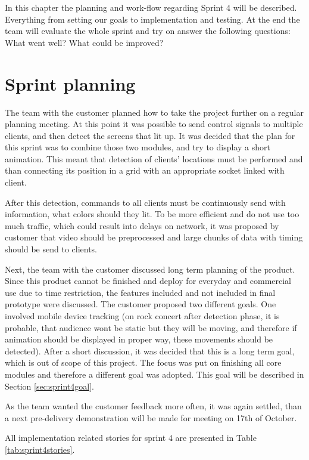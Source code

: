 In this chapter the planning and work-flow regarding Sprint 4 will be described. 
Everything from setting our goals to implementation and testing. At the end the team will evaluate the whole sprint and try on answer the following questions: What went well? What could be improved? 
\section{Sprint planning}

The team with the customer planned how to take the project further on a regular planning meeting.
At this point it was possible to send control signals to multiple clients, and then detect the screens that lit up. 
It was decided that the plan for this sprint was to combine those two modules, and try to display a short animation.
This meant that detection of clients' locations must be performed and than connecting its position in a grid with an appropriate socket linked with client.

After this detection, commands to all clients must be continuously send with information, what colors should they lit.
To be more efficient and do not use too much traffic, which could result into delays on network, it was proposed by customer that video should be preprocessed and large chunks of data with timing should be send to clients.

Next, the team with the customer discussed long term planning of the product.
Since this product cannot be finished and deploy for everyday and commercial use due to time restriction, the features included and not included in final prototype were discussed.
The customer proposed two different goals.
One involved mobile device tracking (on rock concert after detection phase, it is probable, that audience wont be static but they will be moving, and therefore if animation should be displayed in proper way, these movements should be detected).
After a short discussion, it was decided that this is a long term goal, which is out of scope of this project.
The focus was put on finishing all core modules and therefore a different goal was adopted.
This goal will be described in Section \ref{sec:sprint4goal}.

As the team wanted the customer feedback more often, it was again settled, than a next pre-delivery demonstration will be made for meeting on 17th of October. 

All implementation related stories for sprint 4 are presented in Table \ref{tab:sprint4stories}.




